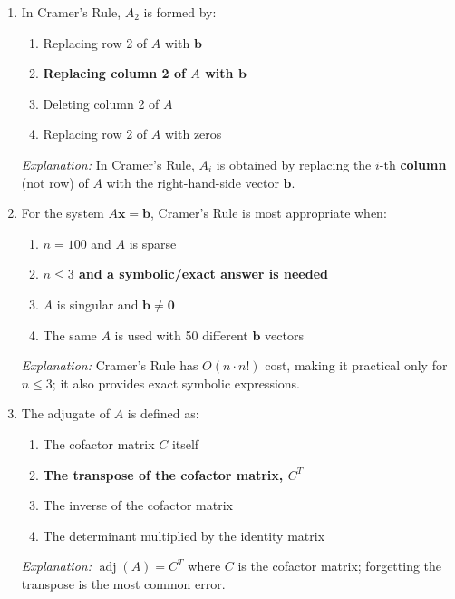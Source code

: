 \documentclass[12pt,a4paper]{article}
\begin{document}
\begin{enumerate}[noitemsep, label=\textbf{MCQ\arabic*.}]

  \item In Cramer's Rule, $A_2$ is formed by:
  \begin{enumerate}[noitemsep, label=(\alph*)]
    \item Replacing row 2 of $A$ with $\mathbf{b}$
    \item \textbf{Replacing column 2 of $A$ with $\mathbf{b}$}
    \item Deleting column 2 of $A$
    \item Replacing row 2 of $A$ with zeros
  \end{enumerate}
  \textit{Explanation:} In Cramer's Rule, $A_i$ is obtained by replacing the $i$-th \textbf{column} (not row) of $A$ with the right-hand-side vector $\mathbf{b}$.

  \item For the system $A\mathbf{x}=\mathbf{b}$, Cramer's Rule is most appropriate when:
  \begin{enumerate}[noitemsep, label=(\alph*)]
    \item $n = 100$ and $A$ is sparse
    \item \textbf{$n \leq 3$ and a symbolic/exact answer is needed}
    \item $A$ is singular and $\mathbf{b} \neq \mathbf{0}$
    \item The same $A$ is used with 50 different $\mathbf{b}$ vectors
  \end{enumerate}
  \textit{Explanation:} Cramer's Rule has $O(n \cdot n!)$ cost, making it practical only for $n \leq 3$; it also provides exact symbolic expressions.

  \item The adjugate of $A$ is defined as:
  \begin{enumerate}[noitemsep, label=(\alph*)]
    \item The cofactor matrix $C$ itself
    \item \textbf{The transpose of the cofactor matrix, $C^T$}
    \item The inverse of the cofactor matrix
    \item The determinant multiplied by the identity matrix
  \end{enumerate}
  \textit{Explanation:} $\operatorname{adj}(A) = C^T$ where $C$ is the cofactor matrix; forgetting the transpose is the most common error.


\end{enumerate}
\end{document}

